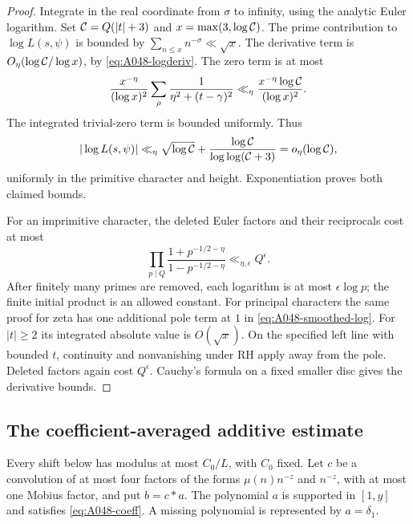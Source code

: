 \begin{proof}
Integrate in the real coordinate from \(\sigma\) to
infinity, using the analytic Euler logarithm.
Set \({\cal C}=Q(|t|+3)\) and
\(x=\max(3,\log{\cal C})\).
The prime contribution to \(\log L(s,\psi)\) is bounded
by \(\sum_{n\le x}n^{-\sigma}\ll\sqrt x\).
The derivative term is
\(O_\eta(\log{\cal C}/\log x)\), by
\eqref{eq:A048-logderiv}. The zero term is at most
\[
 \frac{x^{-\eta}}{(\log x)^2}
       \sum_\rho\frac1{\eta^2+(t-\gamma)^2}
 \ll_\eta\frac{x^{-\eta}\log{\cal C}}{(\log x)^2}.
\]
The integrated trivial-zero term is bounded uniformly.
Thus
\[
 |\log L(s,\psi)|\ll_\eta
 \sqrt{\log{\cal C}}+
       \frac{\log{\cal C}}{\log\log({\cal C}+3)}
             =o_\eta(\log{\cal C}),
\]
uniformly in the primitive character and height.
Exponentiation proves both claimed bounds.

For an imprimitive character, the deleted Euler factors
and their reciprocals cost at most
\[
 \prod_{p\mid Q}\frac{1+p^{-1/2-\eta}}{1-p^{-1/2-\eta}}
                      \ll_{\eta,\epsilon}Q^\epsilon.
\]
After finitely many primes are removed, each logarithm
is at most \(\epsilon\log p\); the finite initial
product is an allowed constant. For principal characters
the same proof for zeta has one additional pole term at
\(1\) in \eqref{eq:A048-smoothed-log}. For \(|t|\ge2\)
its integrated absolute value is \(O(\sqrt x)\).
On the specified left line with bounded \(t\), continuity
and nonvanishing under RH apply away from the pole.
Deleted factors again cost \(Q^\epsilon\).
Cauchy's formula on a fixed smaller disc gives the
derivative bounds.
\end{proof}


\subsection*{The coefficient-averaged additive estimate}

Every shift below has modulus at most \(C_0/L\), with
\(C_0\) fixed. Let \(c\) be a convolution of at most
four factors of the forms \(\mu(n)n^{-z}\) and \(n^{-z}\),
with at most one Mobius factor, and put \(b=c*a\).
The polynomial \(a\) is supported in \([1,y]\) and
satisfies \eqref{eq:A048-coeff}. A missing polynomial
is represented by \(a=\delta_1\).

